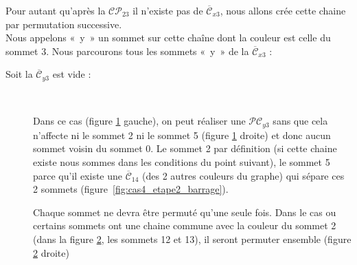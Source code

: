 Pour autant qu'après la  $\mathcal{CP}_{23}$ il n'existe pas de $\overline{\mathcal{C}}_{x3}$, nous allons crée cette chaine par permutation successive.\\  

Nous appelons «~y~» un sommet sur cette chaîne dont la couleur est celle du sommet 3.
Nous parcourons tous les sommets «~y~» de la  $\overline{\mathcal{C}}_{x3}$ :
\begin{adjustwidth}{3.5em}{0pt}
	\begin{description}
		\item[Soit la $\overline{\mathcal{C}}_{y3}$ est vide :]\
		
Dans ce cas (figure \ref{fig:cas4_etape2_2} gauche),  on peut réaliser une $\mathcal{PC}_{y3}$ sans que cela n'affecte ni le sommet 2 ni le sommet 5 (figure \ref{fig:cas4_etape2_2} droite) et donc aucun sommet voisin du sommet 0.
Le sommet 2 par définition (si cette chaine existe nous sommes dans les conditions du point suivant), le sommet 5 parce qu’il existe une $\overline{\mathcal{C}}_{14}$ (des 2 autres couleurs du graphe) qui sépare ces 2 sommets (figure~\ref{fig:cas4_etape2_barrage}).
\begin{figure}[!ht]\centering
	\begin{changemargin}{0cm}{-3cm}
		\begin{center}
			
			\hspace{15pt}
			
		\end{center}
	\end{changemargin}
	\begin{changemargin}{3cm}{0cm}
	\caption{}\label{fig:cas4_etape2_2}
	\end{changemargin}
\end{figure}	
\FloatBarrier

Chaque sommet ne devra être permuté qu'une seule fois. Dans le cas ou certains sommets ont une chaine commune avec la couleur du sommet 2 (dans la figure \ref{fig:cas4_etape2_3}, les sommets 12 et 13), il seront permuter ensemble (figure \ref{fig:cas4_etape2_3} droite)
\begin{figure}[!ht]\centering
	\begin{changemargin}{0cm}{-3cm}
		\begin{center}
			
			\hspace{15pt}
			
		\end{center}
	\end{changemargin}
	\begin{changemargin}{3cm}{0cm}
	\caption{}\label{fig:cas4_etape2_3}
	\end{changemargin}
\end{figure}	
\FloatBarrier


\end{description}
\end{adjustwidth}
